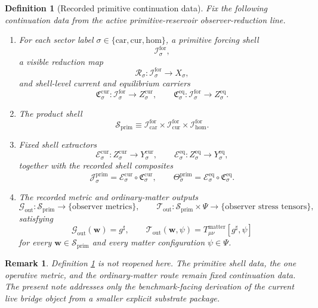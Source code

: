 \documentclass[11pt]{article}
\newcommand{\CompletedMetric}{g^{\sharp}}
\newcommand{\Car}{\mathrm{car}}
\newcommand{\Cur}{\mathrm{cur}}
\newcommand{\Hom}{\mathrm{hom}}
\newcommand{\ForSpace}[1]{\mathcal I_{#1}^{\mathrm{for}}}
\newcommand{\PrimShell}{\mathcal S_{\mathrm{prim}}}
\newcommand{\Reduction}[1]{\mathcal R_{#1}}
\newcommand{\CurrentCarrier}[1]{\mathfrak C_{#1}^{\mathrm{cur}}}
\newcommand{\EqCarrier}[1]{\mathfrak C_{#1}^{\mathrm{eq}}}
\newcommand{\CurrentExtract}[1]{\mathscr E_{#1}^{\mathrm{cur}}}
\newcommand{\EqExtract}[1]{\mathscr E_{#1}^{\mathrm{eq}}}
\newcommand{\PrimCurrent}[1]{\mathcal J_{#1}^{\mathrm{prim}}}
\newcommand{\PrimTheta}[1]{\Theta_{#1}^{\mathrm{prim}}}
\newcommand{\MetricOut}{\mathscr G_{\mathrm{out}}}
\newcommand{\MatterOut}{\mathscr T_{\mathrm{out}}}
\newtheorem{definition}{Definition}
\newtheorem{remark}{Remark}
\begin{document}
\begin{definition}[Recorded primitive continuation data]
\label{def:fixed}
Fix the following continuation data from the active primitive-reservoir observer-reduction line.
\begin{enumerate}
    \item For each sector label \(\sigma\in\{\Car,\Cur,\Hom\}\), a primitive forcing shell
    \[
    \ForSpace{\sigma},
    \]
    a visible reduction map
    \[
    \Reduction{\sigma}:\ForSpace{\sigma}\to X_{\sigma},
    \]
    and shell-level current and equilibrium carriers
    \[
    \CurrentCarrier{\sigma}:\ForSpace{\sigma}\to Z_{\sigma}^{\mathrm{cur}},
    \qquad
    \EqCarrier{\sigma}:\ForSpace{\sigma}\to Z_{\sigma}^{\mathrm{eq}}.
    \]
    \item The product shell
    \[
    \PrimShell
    \equiv
    \ForSpace{\Car}\times \ForSpace{\Cur}\times \ForSpace{\Hom}.
    \]
    \item Fixed shell extractors
    \[
    \CurrentExtract{\sigma}:Z_{\sigma}^{\mathrm{cur}}\to Y_{\sigma}^{\mathrm{cur}},
    \qquad
    \EqExtract{\sigma}:Z_{\sigma}^{\mathrm{eq}}\to Y_{\sigma}^{\mathrm{eq}},
    \]
    together with the recorded shell composites
    \begin{equation}
    \PrimCurrent{\sigma}
    =
    \CurrentExtract{\sigma}\circ \CurrentCarrier{\sigma},
    \qquad
    \PrimTheta{\sigma}
    =
    \EqExtract{\sigma}\circ \EqCarrier{\sigma}.
    \label{eq:primcomposites}
    \end{equation}
    \item The recorded metric and ordinary-matter outputs
    \[
    \MetricOut:\PrimShell\to\{\text{observer metrics}\},
    \qquad
    \MatterOut:\PrimShell\times\Psi\to\{\text{observer stress tensors}\},
    \]
    satisfying
    \begin{equation}
    \MetricOut(\mathbf w)=\CompletedMetric,
    \qquad
    \MatterOut(\mathbf w,\psi)
    =
    T_{\mu\nu}^{\mathrm{matter}}[\CompletedMetric,\psi]
    \label{eq:fixedoutputs}
    \end{equation}
    for every \(\mathbf w\in\PrimShell\) and every matter configuration \(\psi\in\Psi\).
\end{enumerate}
\end{definition}

\begin{remark}
Definition \ref{def:fixed} is not reopened here. The primitive shell data, the one operative metric, and the ordinary-matter route remain fixed continuation data. The present note addresses only the benchmark-facing derivation of the current live bridge object from a smaller explicit substrate package.
\end{remark}
\end{document}
